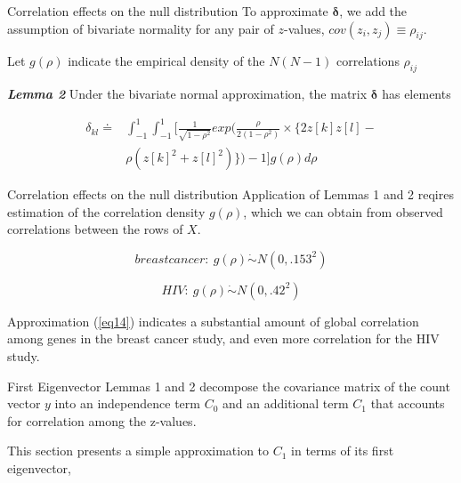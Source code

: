 \documentclass{beamer}
\begin{document}
\begin{frame}[t]{Correlation effects on the null distribution}\vspace{10pt}
To approximate $\boldsymbol{\delta}$, we add the assumption of bivariate normality for any pair of $z$-values, $cov(z_i, z_j) \equiv \rho_{ij}$. 

Let $g(\rho)$ indicate the empirical density of the $N(N-1)$ correlations $\rho_{ij}$

\textbf{\textit{Lemma 2}} Under the bivariate normal approximation, the matrix $\boldsymbol{\delta}$ has elements

\begin{equation}\label{eq13}
\begin{split}
\delta_{kl}  \doteq & \int_{-1}^{1}\int_{-1}^{1} [\frac{1}{\sqrt{1-\rho^2}}exp(\frac{\rho}{2(1-\rho^2)}\times \{2z[k]z[l] - \\
& \rho(z[k]^2+z[l]^2)\} ) -1  ] g(\rho)d\rho
\end{split}
\end{equation}

\end{frame}

\begin{frame}[t]{Correlation effects on the null distribution}\vspace{10pt}
Application of Lemmas 1 and 2 reqires estimation of the correlation density $g(\rho)$, which we can obtain from observed correlations between the rows of $X$.

\begin{equation}\label{eq14}
breast cancer: \ g(\rho) \dot{\sim} N(0,.153^2)
\end{equation}

\begin{equation}\label{eq15}
HIV: \ g(\rho) \dot{\sim} N(0,.42^2)
\end{equation}

Approximation (\ref{eq14}) indicates a substantial amount of global correlation among genes in the breast cancer study, and even more correlation for the HIV study.

\end{frame}

\begin{frame}[t]{First Eigenvector}\vspace{10pt}
Lemmas 1 and 2 decompose the covariance matrix of the count vector $y$ into an independence term $C_0$ and an additional term $C_1$ that accounts for correlation among the z-values.

This section presents a simple approximation to $C_1$ in terms of its first eigenvector,

\end{frame}
\end{document}
